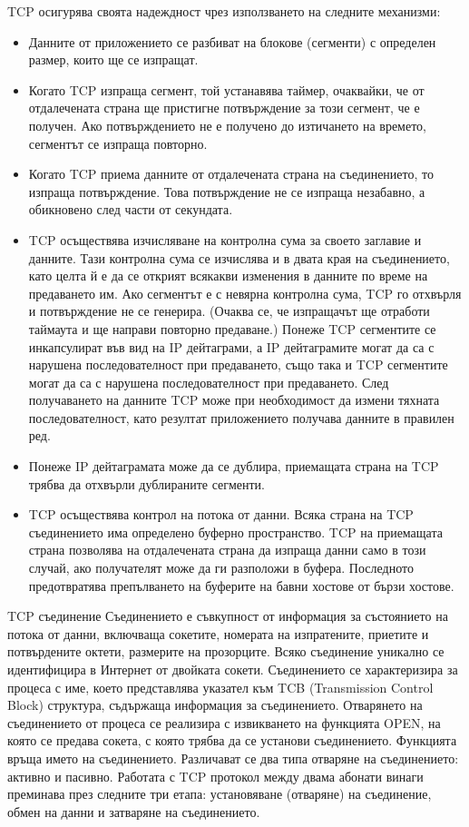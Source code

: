 \documentclass{article}
\begin{document}
TCP осигурява своята надеждност чрез използването на следните механизми:
\begin{itemize}
    \item Данните от приложението се разбиват на блокове (сегменти) с определен размер, които ще се изпращат.
    \item Когато TCP изпраща сегмент, той устанавява таймер, очаквайки, че от отдалечената страна ще пристигне потвърждение за
    този сегмент, че е получен. Ако потвърждението не е получено до изтичането на времето, сегментът се изпраща повторно.
    \item Когато TCP приема данните от отдалечената страна на съединението, то изпраща потвърждение. Това потвърждение не се
    изпраща незабавно, а обикновено след части от секундата.
    \item TCP осъществява изчисляване на контролна сума за своето заглавие и данните. Тази контролна сума се изчислява и в двата
    края на съединението, като целта й е да се открият всякакви изменения в данните по време на предаването им. Ако сегментът е с
    невярна контролна сума, TCP го отхвърля и потвърждение не се генерира. (Очаква се, че изпращачът ще отработи таймаута и ще
    направи повторно предаване.) Понеже TCP сегментите се инкапсулират във вид на IP дейтаграми, а IP дейтаграмите могат да са с
    нарушена последователност при предаването, също така и TCP сегментите могат да са с нарушена последователност при предаването.
    След получаването на данните TCP може при необходимост да измени тяхната последователност, като резултат приложението получава
    данните в правилен ред.
    \item Понеже IP дейтаграмата може да се дублира, приемащата страна на TCP трябва да отхвърли дублираните сегменти.
    \item TCP осъществява контрол на потока от данни. Всяка страна на TCP съединението има определено буферно пространство. TCP
    на приемащата страна позволява на отдалечената страна да изпраща данни само в този случай, ако получателят може да ги
    разположи в буфера. Последното предотвратява препълването на буферите на бавни хостове от бързи хостове.
\end{itemize}

TCP съединение \newline
Съединението е съвкупност от информация за състоянието на потока от данни, включваща сокетите, номерата на изпратените, приетите
и потвърдените октети, размерите на прозорците. Всяко съединение уникално се идентифицира в Интернет от двойката сокети.
Съединението се характеризира за процеса с име, което представлява указател към TCB (Transmission Control Block) структура,
съдържаща информация за съединението. Отварянето на съединението от процеса се реализира с извикването на функцията OPEN, на
която се предава сокета, с която трябва да се установи съединението. Функцията връща името на съединението. Различават се два
типа отваряне на съединението: активно и пасивно. Работата с TCP протокол между двама абонати винаги преминава през следните
три етапа: установяване (отваряне) на съединение, обмен на данни и затваряне на съединението.
\end{document}
